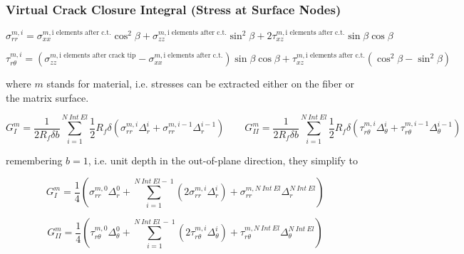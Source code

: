 \documentclass[first,firstsupp,lastsupp,handout,last,hyperref,table]{ETHclass}
\begin{document}
\begin{frame}
\frametitle{\small Virtual Crack Closure Integral (Stress at Surface Nodes)}
\vspace{-0.7cm}
\tiny
\centering
\captionsetup[figure]{font=scriptsize,labelfont=scriptsize}

\begin{equation}
\sigma_{rr}^{m,i} = \sigma_{xx}^{m,\text{i elements after c.t.}}\cos^{2}{\beta}+\sigma_{zz}^{m,\text{i elements after c.t.}}\sin^{2}{\beta}+2\tau_{xz}^{m,\text{i elements after c.t.}}\sin{\beta}\cos{\beta}
\end{equation}

\begin{equation}
\tau_{r\theta}^{m,i} = \left(\sigma_{zz}^{m,\text{i elements after crack tip}}-\sigma_{xx}^{m,\text{i elements after c.t.}}\right)\sin{\beta}\cos{\beta}+\tau_{xz}^{m,\text{i elements after c.t.}}\left(\cos^{2}{\beta}-\sin^{2}{\beta}\right)
\end{equation}

where $m$ stands for material, i.e. stresses can be extracted either on the fiber or the matrix surface.

\begin{equation}
G_{I}^{m}=\frac{1}{2 R_{f}\delta b}\sum_{i=1}^{N\ Int\ El}\frac{1}{2} R_{f}\delta\left(\sigma_{rr}^{m,i}\Delta_{r}^{i}+\sigma_{rr}^{m,i-1}\Delta_{r}^{i-1}\right)\qquad G_{II}^{m}=\frac{1}{2 R_{f}\delta b}\sum_{i=1}^{N\ Int\ El}\frac{1}{2} R_{f}\delta\left(\tau_{r\theta}^{m,i}\Delta_{\theta}^{i}+\tau_{r\theta}^{m,i-1}\Delta_{\theta}^{i-1}\right)
\end{equation}

remembering $b=1$, i.e. unit depth in the out-of-plane direction, they simplify to

\begin{equation}
G_{I}^{m}=\frac{1}{4}\left(\sigma_{rr}^{m,0}\Delta_{r}^{0}+\sum_{i=1}^{N\ Int\ El -\ 1}\left(2\sigma_{rr}^{m,i}\Delta_{r}^{i}\right)+\sigma_{rr}^{m,N\ Int\ El}\Delta_{r}^{N\ Int\ El}\right)
\end{equation}

\begin{equation}
G_{II}^{m}=\frac{1}{4}\left(\tau_{r\theta}^{m,0}\Delta_{\theta}^{0}+\sum_{i=1}^{N\ Int\ El\ -\ 1}\left(2\tau_{r\theta}^{m,i}\Delta_{\theta}^{i}\right)+\tau_{r\theta}^{m,N\ Int\ El}\Delta_{\theta}^{N\ Int\ El}\right)
\end{equation}

\end{frame}
\end{document}
